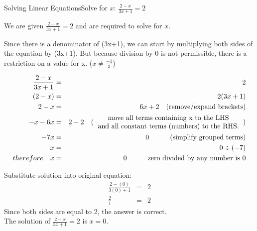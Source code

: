 \documentclass[10pt,a4paper,titlepage,twoside,openright]{report}
\begin{document}
\begin{wex}{Solving Linear Equations}{Solve for $x$: $\frac{2-x}{3x+1}=2$}{
We are given $\frac{2-x}{3x+1}=2$ and are required to solve for $x$.

Since there is a denominator of (3x+1), we can start by multiplying both sides
of the equation by (3x+1). But because division by 0 is not permissible, there
is a restriction on a value for x. ($x\neq\frac{-1}{3}$)

\begin{eqnarray*}
\frac{2-x}{3x+1}&=&2\\
(2-x)&=&2(3x+1)\\
2-x&=&6x+2\quad\mbox{(remove/expand brackets)}\\
-x-6x&=&2-2\quad\mbox{(\begin{tabular}{c}move all terms containing x to the LHS\\ and all constant
terms (numbers) to the RHS.\end{tabular})}\\
-7x&=&0\quad\quad\quad\mbox{(simplify grouped terms)}\\
x&=&0\div{(-7)}\\
therefore\quad x&=&0\quad\quad\quad\mbox{zero divided by any number is 0}\\
\end{eqnarray*}

Substitute solution into original equation:
\begin{eqnarray*}
\frac{2-(0)}{3(0)+1}&=&2\\
\frac{2}{1}&=&2
\end{eqnarray*}
Since both sides are equal to 2, the answer is correct.\\
The solution of $\frac{2-x}{3x+1}=2$ is $x=0$.}
\end{wex}
\end{document}
